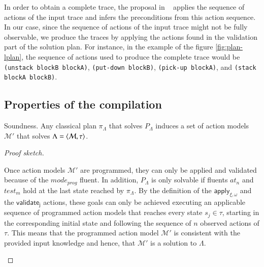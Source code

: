 \textcolor[rgb]{1.00,0.00,0.00}{In order to obtain a complete trace, the proposal in ~\cite{kuvcera2018louga} applies the sequence of actions of the input trace and infers the preconditions from this \FO action sequence}. In our case, since the sequence of actions of the input trace might not be fully observable, we produce the traces by applying the actions found in the validation part of the solution plan. For instance, in the example of the figure \ref{fig:plan-lplan}, the sequence of actions used to produce the complete trace would be {\tt{\small(unstack blockB blockA)}}, {\tt{\small(put-down blockB)}}, {\tt{\small(pick-up blockA)}}, and {\tt{\small(stack blockA blockB)}}.



\subsection{Properties of the compilation}
\label{properties}


\begin{mylemma}
Soundness. Any classical plan $\pi_\Lambda$ that solves $P_{\Lambda}$ induces a set of action models $\mathcal{M}'$ that solves $\Lambda={\langle \mathcal{M},\tau \rangle}$.
\end{mylemma}

\begin{proof}[Proof sketch]
\begin{small}
  Once action models $\mathcal{M}'$ are programmed, they can only be applied and validated because of the $mode_{prog}$ fluent. In addition, $P_{\Lambda}$ is only solvable if fluents {\tt\small $at_n$} and {\tt\small $test_m$} hold at the last state reached by $\pi_\Lambda$. By the definition of the $\mathsf{apply_{\xi,\omega}}$ and the $\mathsf{validate_{j}}$ actions, these goals can only be achieved executing an applicable sequence of programmed action models that reaches every state $s_j\in\tau$, starting in the corresponding initial state and following the sequence of $n$ observed actions of $\tau$. This means that the programmed action model $\mathcal{M}'$ is consistent with the provided input knowledge and hence, that $\mathcal{M}'$ is a solution to $\Lambda$.
\end{small}
\end{proof}


